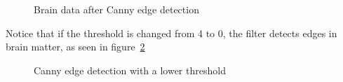 \documentclass[fleqn,11pt,openany]{book}
\begin{document}
\begin{figure}
\caption{Brain data after Canny edge detection}\label{fig:CannyAfter}
\end{figure}

Notice that if the threshold is changed from 4 to 0, the filter detects edges in brain matter, as seen in figure~\ref{fig:CannyAfterMatter}

\begin{figure}
\caption{Canny edge detection with a lower threshold}\label{fig:CannyAfterMatter}
\end{figure}
\end{document}
